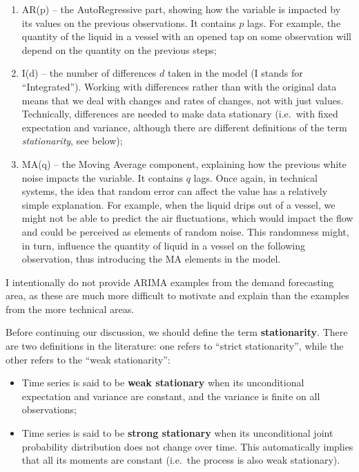\documentclass[
]{book}
\providecommand{\tightlist}{%
  \setlength{\itemsep}{0pt}\setlength{\parskip}{0pt}}
\theoremstyle{definition}
\theoremstyle{definition}
\theoremstyle{definition}
\theoremstyle{definition}
\theoremstyle{remark}
\begin{document}
\begin{enumerate}
\def\labelenumi{\arabic{enumi}.}
\tightlist
\item
  AR(p) -- the AutoRegressive part, showing how the variable is impacted by its values on the previous observations. It contains \(p\) lags. For example, the quantity of the liquid in a vessel with an opened tap on some observation will depend on the quantity on the previous steps;
\item
  I(d) -- the number of differences \(d\) taken in the model (I stands for ``Integrated''). Working with differences rather than with the original data means that we deal with changes and rates of changes, not with just values. Technically, differences are needed to make data stationary (i.e.~with fixed expectation and variance, although there are different definitions of the term \emph{stationarity}, see below);
\item
  MA(q) -- the Moving Average component, explaining how the previous white noise impacts the variable. It contains \(q\) lags. Once again, in technical systems, the idea that random error can affect the value has a relatively simple explanation. For example, when the liquid drips out of a vessel, we might not be able to predict the air fluctuations, which would impact the flow and could be perceived as elements of random noise. This randomness might, in turn, influence the quantity of liquid in a vessel on the following observation, thus introducing the MA elements in the model.
\end{enumerate}

I intentionally do not provide ARIMA examples from the demand forecasting area, as these are much more difficult to motivate and explain than the examples from the more technical areas.

Before continuing our discussion, we should define the term \textbf{stationarity}. There are two definitions in the literature: one refers to ``strict stationarity'', while the other refers to the ``weak stationarity'':

\begin{itemize}
\tightlist
\item
  Time series is said to be \textbf{weak stationary} when its unconditional expectation and variance are constant, and the variance is finite on all observations;
\item
  Time series is said to be \textbf{strong stationary} when its unconditional joint probability distribution does not change over time. This automatically implies that all its moments are constant (i.e.~the process is also weak stationary).
\end{itemize}
\end{document}
